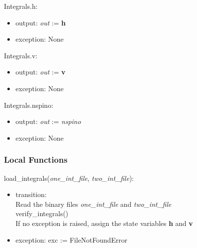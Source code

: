 \documentclass[12pt, titlepage]{article}
\begin{document}
\noindent Integrals.h:
\begin{itemize}
	\item output: \textit{out} := \textbf{h} 
	\item exception: None 
\end{itemize}

\noindent Integrals.v:
\begin{itemize}
	\item output: \textit{out} := \textbf{v} 
	\item exception: None 
\end{itemize}

\noindent Integrals.nspino:
\begin{itemize}
	\item output: \textit{out} := \textit{nspino} 
	\item exception: None 
\end{itemize}

%

\subsubsection{Local Functions}

\noindent load\_integrals(\textit{one\_int\_file}, \textit{two\_int\_file}):
\begin{itemize}
	\item transition: \\
	Read the binary files \textit{one\_int\_file} and 
	\textit{two\_int\_file} \\
	verify\_integrals()\\
	If no exception is raised, assign the state variables \textbf{h} and 
	\textbf{v}	
	\item exception: exc := FileNotFoundError
\end{itemize}
\end{document}
